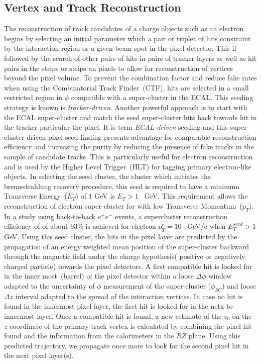 \begin{itemize}
\end{itemize} 

\subsection{Vertex and Track Reconstruction}
The reconstruction of track candidates of a charge objects such as an electron begins by selecting an initial parameter which a pair or triplet of hits constraint by the interaction region or a given beam spot in the pixel detector.  This if followed by the search of other pairs of hits in pairs of tracker layers as well as hit pairs in the strips or strips an pixels  to allow for reconstruction of vertices beyond the pixel volume. To prevent the combination factor and reduce fake rates when using the Combinatorial Track Finder~(CTF), hits are selected in a small restricted region in $\phi$  compatible with a super-cluster in the ECAL. This seeding strategy is known is \textit{tracker-driven}. Another  powerful approach is to start with  the ECAL super-cluster and match the seed super-cluster hits back towards hit in the tracker particular the pixel. It is term \textit{ECAL-driven} seeding and this super-cluster-driven pixel seed finding presents advantage for comparable reconstruction efficiency and increasing the purity by reducing the presence of fake tracks in the sample of candidate tracks. This is particularly useful for electron reconstruction and is used by the Higher Level Trigger~(HLT) for tagging primary electron-like objects. \newline
In selecting the seed cluster, the cluster which initiates the bremsstrahlung recovery procedure, this seed is required to have a minimum Transverse Energy~($E_{T}$)  of  1 GeV is $E_{T} > 1$~ GeV. This requirement allows the reconstruction of electron super-cluster for with low Transverse Momentum~($p_{T}$). In a study using back-to-back $e^{+}e^{-}$ events, a supercluster reconstruction efficiency of of about 93\%  is achieved for electron $p^{e}_{T}  = 10$~ GeV/c when $E^{seed}_{T} > 1$ GeV.
Using this seed cluster, the hits in the pixel layer are predicted by the propagation of an energy weighted mean position of the super-cluster backward through the magnetic field under the charge hypothesis( positive or negatively charged particle) towards the pixel detectors. A first compatible hit is looked for in the inner most~(barrel) of the pixel detector within a loose $\Delta\phi$ window adapted to the uncertainty  of $\phi$ measurement of the super-cluster ($\phi_{SC}$) and loose $\Delta z$ interval adapted to the spread of the interaction vertices. In case no hit is found in the innermost pixel layer, the first hit is looked for in the netx-to-innermost layer. Once a compatible hit is found, a new  estimate of the $z_{0}$ on the $z$ coordinate of the primary track vertex is calculated by combining the pixel hit found and the information from the calorimeters in the $RZ$ plane. Using this predicted trajectory, we propagate once more to look for the second pixel hit in the next pixel layer(s). 

